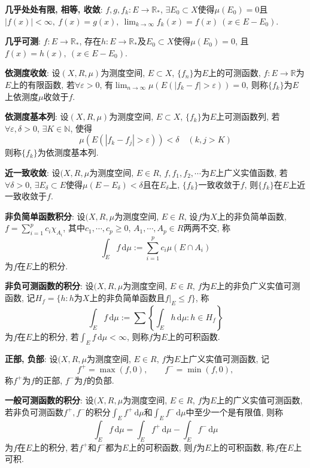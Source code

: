 \documentclass[12pt, a4paper, oneside]{ctexart}
\let\leq=\leqslant %
\let\geq=\geqslant %
\def\R{\mathbb{R}}          %
\def\N{\mathbb{N}}          %
\def\d{\mathrm{d}}          %
\begin{document}
\textbf{几乎处处有限, 相等, 收敛}: $f,g,f_k:E\to\R_*$, $\exists E_0\subset X$使得$\mu(E_0) = 0$且$|f(x)| < \infty,\  f(x) = g(x),\ \lim_{k\to\infty}f_k(x) = f(x)\ (x\in E-E_0)$.

\textbf{几乎可测}: $f:E\to\R_*$, 存在$h:E\to\R_*$及$E_0\subset X$使得$\mu(E_0) = 0$, 且$f(x) = h(x),\ (x\in E-E_0)$.

\textbf{依测度收敛}: 设$(X, R, \mu)$为测度空间, $E\subset X$, $\{f_n\}$为$E$上的可测函数, $f:E\to\R$为$E$上的有限函数, 若$\forall \varepsilon > 0$, 有$\lim_{n\to\infty}\mu(E(|f_k-f| > \varepsilon)) = 0$, 则称$\{f_k\}$为$E$上依测度$\mu$收敛于$f$.

\textbf{依测度基本列}: 设$(X, R, \mu)$为测度空间, $E\subset X$, $\{f_k\}$为$E$上可测函数列, 若$\forall \varepsilon,\delta>0$, $\exists K\in \N$, 使得
\begin{equation*}
    \mu(E(|f_k-f_j| > \varepsilon)) < \delta \quad (k, j > K)
\end{equation*}
则称$\{f_k\}$为依测度基本列.

\textbf{近一致收敛}: 设$(X, R, \mu$为测度空间, $E\in R$, $f, f_1, f_2,\cdots$为$E$上广义实值函数, 若$\forall \delta > 0$, $\exists E_\delta \subset E$使得$\mu(E-E_\delta) < \delta$且在$E_\delta$上, $\{f_k\}$一致收敛于$f$, 则$\{f_k\}$在$E$上近一致收敛于$f$.

\textbf{非负简单函数积分}: 设$(X, R, \mu$为测度空间, $E\in R$, 设$f$为$X$上的非负简单函数, $f=\sum_{i=1}^pc_i\chi_{A_i}$, 其中$c_1,\cdots, c_p\geq 0$, $A_1,\cdots, A_p\in R$两两不交, 称
\begin{equation*}
    \int_Ef\,\d \mu:=\sum_{i=1}^pc_i\mu(E\cap A_i)
\end{equation*}
为$f$在$E$上的积分.

\textbf{非负可测函数的积分}: 设$(X, R, \mu$为测度空间, $E\in R$, $f$为$E$上的非负广义实值可测函数, 记$H_f = \{h:h\text{为}X\text{上的非负简单函数且}f|_E\leq f\}$, 称
\begin{equation*}
    \int_Ef\,\d \mu:=\sum\left\{\int_Eh\,\d \mu:h\in H_f\right\}
\end{equation*}
为$f$在$E$上的积分, 若$\int_Ef\,\d \mu < \infty$, 则称$f$为$E$上的可积函数.

\textbf{正部, 负部}: 设$(X, R, \mu$为测度空间, $E\in R$, $f$为$E$上广义实值可测函数, 记
\begin{equation*}
    f^+=\max(f, 0),\qquad f^-=\min(f, 0),
\end{equation*}
称$f^+$为$f$的正部, $f^-$为$f$的负部.

\textbf{一般可测函数的积分}: 设$(X, R, \mu$为测度空间, $E\in R$, $f$为$E$上的广义实值可测函数, 若非负可测函数$f^+, f^-$的积分$\int_Ef^+\,\d \mu$和$\int_Ef^-\,\d \mu$中至少一个是有限值, 则称
\begin{equation*}
    \int_Ef\,\d \mu = \int_Ef^+\,\d \mu - \int_Ef^-\,\d \mu
\end{equation*}
为$f$在$E$上的积分, 若$f^+$和$f^-$都为$E$上的可积函数, 则$f$为$E$上的可积函数, 称$f$在$E$上可积.
\end{document}
